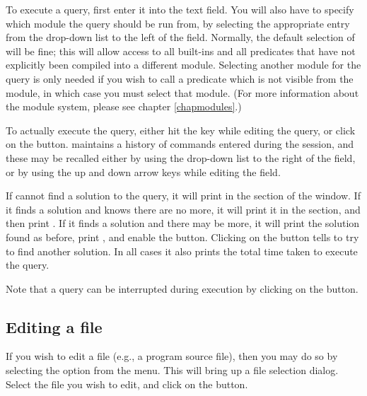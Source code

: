 To execute a query, first enter it into the 
text field.
You will also have to specify which module the query should be run from, by
selecting the appropriate entry from the drop-down list to the left of the
 field.
Normally, the default selection of  will be fine; this will
allow access to all {\eclipse} built-ins and all predicates that have not
explicitly been compiled into a different module.
Selecting another module for the query is only needed if you wish to call a
predicate which is not visible from the  module, in which
case you must select that module.
(For more information about the module system, please see chapter
\ref{chapmodules}.)

To actually execute the query, either hit the  key while
editing the query, or click on the  button.
{\tkeclipse} maintains a history of commands entered during the session, and
these may be recalled either by using the drop-down list to the right of the
 field, or by using the up and down arrow keys while
editing the  field.

If {\eclipse} cannot find a solution to the query, it will print 
in the  section of the {\tkeclipse} window.
If it finds a solution and knows there are no more, it will print it in the
 section, and then print .
If it finds a solution and there may be more, it will print the solution
found as before, print , and enable the  button.
Clicking on the  button tells {\eclipse} to try to find
another solution.
In all cases it also prints the total time taken to execute the query.

Note that a query can be interrupted during execution by clicking on the
 button.

\subsection{Editing a file}
\label{secedit}

If you wish to edit a file (e.g., a program source file), then you may do so
by selecting the  option from the  menu.
This will bring up a file selection dialog.
Select the file you wish to edit, and click on the  button.

